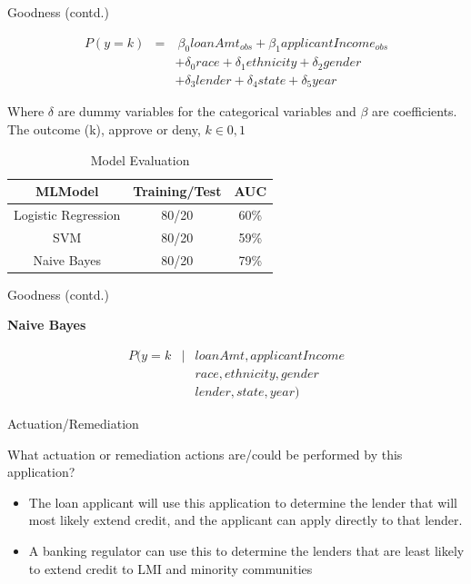 \documentclass{beamer}
\begin{document}
\begin{frame}{Goodness (contd.)}

\begin{eqnarray*}
P(y=k) & = & \ \beta_0 loanAmt_{obs}  + \beta_1 applicantIncome_{obs} \\
& & + \delta_0 race + \delta_1 ethnicity  + \delta_2 gender  \\
& & + \delta_3 lender  +  \delta_4 state + \delta_5 year
\end{eqnarray*}

Where $\delta$ are dummy variables for the categorical variables and $\beta$ are coefficients. The outcome (k), approve or deny, $k \in 0,1$

\begin{table}[]
\begin{tabular}{|c|c|c|}
\hline
\textbf{MLModel}    & \textbf{Training/Test} & \textbf{AUC} \\ \hline
Logistic Regression & 80/20                  & 60\%         \\ \hline
SVM                 & 80/20                  & 59\%         \\ \hline
Naive Bayes         & 80/20                  & 79\%         \\ \hline
\end{tabular}
\caption{Model Evaluation}
\label{tab:my-table}
\end{table}



\end{frame}

\begin{frame}{Goodness (contd.)}

\textbf{Naive Bayes}

\begin{eqnarray*}
  P(y=k & | & loanAmt, applicantIncome \\
& & race, ethnicity, gender  \\
& & lender, state, year)
\end{eqnarray*}

\end{frame}


\begin{frame}{Actuation/Remediation}

What actuation or remediation actions are/could be performed by this application?  \vspace{3mm}

\begin{itemize}
  \item The loan applicant will use this application to determine the lender that will most likely extend credit, and the applicant can apply directly to that lender. 
  \item A banking regulator can use this to determine the lenders that are least likely to extend credit to LMI and minority communities 
\end{itemize}


\end{frame}
\end{document}
